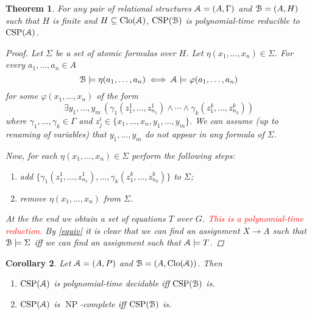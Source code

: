 \documentclass{amsart}
\theoremstyle{plain}
\newtheorem{theorem}{Theorem}[section]
\newtheorem{corollary}[theorem]{Corollary}
\theoremstyle{definition}
\theoremstyle{remark}
\def\phi{\varphi}
\def\E{\exists}
\DeclareMathOperator{\Clo}{Clo}
\DeclareMathOperator{\CSP}{CSP}
\DeclareMathOperator{\NP}{NP}
\begin{document}
\begin{theorem}
    For any pair of relational structures $\EuScript{A}=(A,\Gamma)$ 
    and $\EuScript{B}=(A, H)$ 
    such that $H$ is finite and $H \subseteq \Clo(\EuScript{A})$, $\CSP(\EuScript{B})$ is polynomial-time reducible to $\CSP(\EuScript{A})$.
    \begin{proof}
        Let $\Sigma$ be a set of atomic formulas over $H$.  
        Let $\eta(x_1, \ldots, x_n) \in \Sigma$. 
        For every $a_1, \ldots, a_n \in A$ 
        \begin{equation}
            \label{equiv}
            \EuScript{B} \models \eta(a_1, \ldots, a_n)  
            \iff \EuScript{A} \models \phi(a_1, \ldots, a_n)
        \end{equation}
        for some $\phi(x_1, \ldots, x_n)$ of the form 
        \begin{equation*}
            \E y_1, \ldots, y_m \,( \gamma_1(z^{1}_{1}, \ldots, z^{1}_{n_1}) \land \cdots \land \gamma_k(z^{k}_{1}, \ldots, z^{k}_{n_k}))
        \end{equation*} 
        where $\gamma_1, \ldots, \gamma_k \in \Gamma$ and $z^{i}_{j} \in \{x_1, \ldots, x_n, y_1, \ldots, y_m\}$.
        We can assume (up to renaming of variables) that $y_1, \ldots, y_m$ do not appear in any formula of $\Sigma$.  

        Now, for each $\eta(x_1, \ldots, x_n) \in \Sigma$ perform the following steps: 
        \begin{enumerate}
            \item add $\{\gamma_1(z^{1}_{1}, \ldots, z^{1}_{n_1}), \ldots, \gamma_k(z^{k}_{1}, \ldots, z^{k}_{n_k})\}$ to $\Sigma$; 
            \item remove $\eta(x_1, \ldots, x_n)$ from $\Sigma$. 
        \end{enumerate}
        At the the end we obtain a set of equations $T$ over $G$. 
        \textcolor{red}{This is a polynomial-time reduction. 
        } 
        By \eqref{equiv} it is clear that we can find an assignment $X \to A$ such that $\EuScript{B} \models \Sigma$ iff we can find an assignment such that $\EuScript{A} \models T$.
    \end{proof} 
\end{theorem}

\begin{corollary}
    Let $\EuScript{A}=(A,P)$ and $\EuScript{B}=(A, \Clo(\EuScript{A}))$. 
    Then 
    \begin{enumerate}
        \item $\CSP(\EuScript{A})$ is polynomial-time decidable iff $\CSP(\EuScript{B})$ is. 
        \item $\CSP(\EuScript{A})$ is $\NP$-complete iff $\CSP(\EuScript{B})$ is. 
    \end{enumerate}
\end{corollary}
\end{document}
